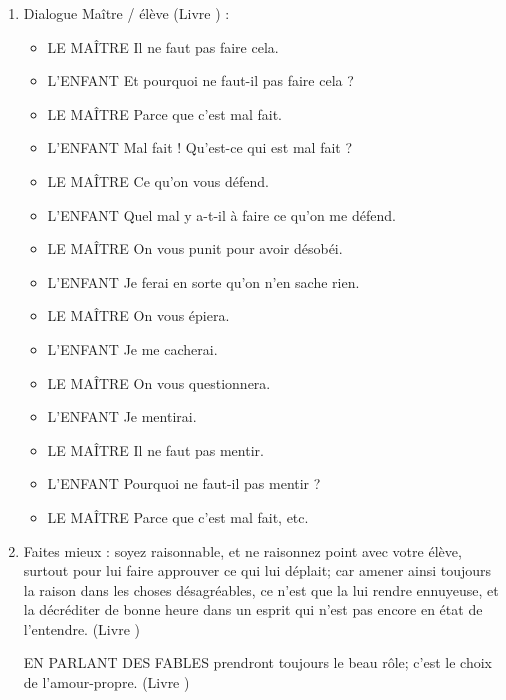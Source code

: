 \documentclass[a4paper, 11pt, hidelinks]{article}
\newcommand{\rb}[1]{\Romanbar{#1}}
\begin{document}
\begin{enumerate}
    \item Dialogue Maître / élève (Livre \rb{2}) : \begin{itemize}
                                    \item LE MAÎTRE Il ne faut pas faire cela.
                                    \item L'ENFANT Et pourquoi ne faut-il pas faire cela ?
                                    \item LE MAÎTRE Parce que c'est mal fait.
                                    \item L'ENFANT Mal fait ! Qu'est-ce qui est mal fait ?
                                    \item LE MAÎTRE Ce qu'on vous défend.
                                    \item L'ENFANT Quel mal y a-t-il à faire ce qu'on me défend.
                                    \item LE MAÎTRE On vous punit pour avoir désobéi.
                                    \item L'ENFANT Je ferai en sorte qu'on n'en sache rien.
                                    \item LE MAÎTRE On vous épiera.
                                    \item L'ENFANT Je me cacherai.
                                    \item LE MAÎTRE On vous questionnera.
                                    \item L'ENFANT Je mentirai.
                                    \item LE MAÎTRE Il ne faut pas mentir.
                                    \item L'ENFANT Pourquoi ne faut-il pas mentir ?
                                    \item LE MAÎTRE Parce que c'est mal fait, etc.
                                \end{itemize}
    \item Faites mieux : soyez raisonnable, et ne raisonnez point avec votre élève, surtout pour lui faire approuver ce qui lui déplait; car amener ainsi toujours la raison dans les choses désagréables, ce n'est que la lui rendre ennuyeuse, et la décréditer de bonne heure dans un esprit qui n'est pas encore en état de l'entendre. (Livre \rb{2})
    \item [EN PARLANT DES FABLES] prendront toujours le beau rôle; c'est le choix de l'amour-propre. (Livre \rb{2})

\end{enumerate}
\end{document}
